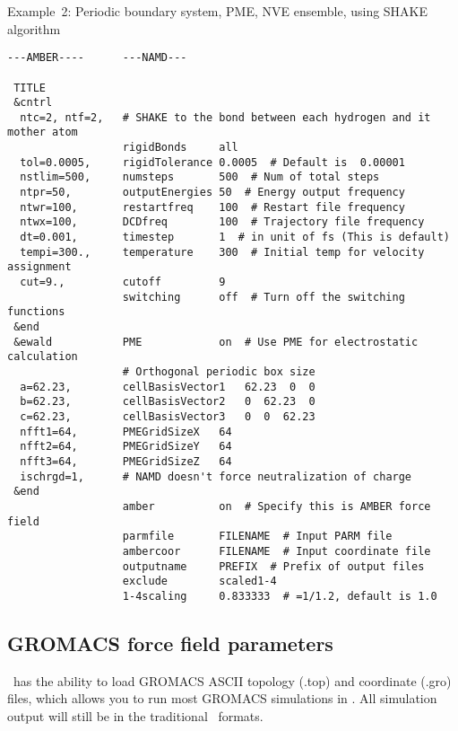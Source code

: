 \noindent Example~2: Periodic boundary system, PME, NVE ensemble,
using SHAKE algorithm

\begin{verbatim}
---AMBER----      ---NAMD---

 TITLE
 &cntrl
  ntc=2, ntf=2,   # SHAKE to the bond between each hydrogen and it mother atom
                  rigidBonds     all
  tol=0.0005,     rigidTolerance 0.0005  # Default is  0.00001
  nstlim=500,     numsteps       500  # Num of total steps
  ntpr=50,        outputEnergies 50  # Energy output frequency
  ntwr=100,       restartfreq    100  # Restart file frequency
  ntwx=100,       DCDfreq        100  # Trajectory file frequency
  dt=0.001,       timestep       1  # in unit of fs (This is default)
  tempi=300.,     temperature    300  # Initial temp for velocity assignment
  cut=9.,         cutoff         9
                  switching      off  # Turn off the switching functions
 &end
 &ewald           PME            on  # Use PME for electrostatic calculation
                  # Orthogonal periodic box size
  a=62.23,        cellBasisVector1   62.23  0  0
  b=62.23,        cellBasisVector2   0  62.23  0
  c=62.23,        cellBasisVector3   0  0  62.23
  nfft1=64,       PMEGridSizeX   64
  nfft2=64,       PMEGridSizeY   64
  nfft3=64,       PMEGridSizeZ   64
  ischrgd=1,      # NAMD doesn't force neutralization of charge
 &end
                  amber          on  # Specify this is AMBER force field
                  parmfile       FILENAME  # Input PARM file
                  ambercoor      FILENAME  # Input coordinate file
                  outputname     PREFIX  # Prefix of output files
                  exclude        scaled1-4
                  1-4scaling     0.833333  # =1/1.2, default is 1.0
\end{verbatim}

\subsection{GROMACS force field parameters}

\NAMD\ has the ability to load GROMACS ASCII topology (.top) and
coordinate (.gro) files, which allows you to run most GROMACS
simulations in \NAMD.  All simulation output will still be in the
traditional \NAMD\ formats.


